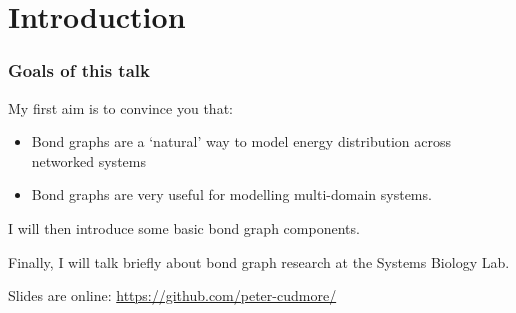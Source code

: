 \section{Introduction}
\begin{frame}
\frametitle{Goals of this talk}
My first aim is to convince you that:
\begin{itemize}
	\item Bond graphs are a `natural' way to model energy distribution across networked systems
	\item Bond graphs are very useful for modelling multi-domain systems.
\end{itemize}

\vspace{10pt}

I will then introduce some basic bond graph components.
\vspace{10pt}

Finally, I will talk briefly about bond graph research at the Systems Biology Lab.
\vspace{10pt}

Slides are online: \url{https://github.com/peter-cudmore/}
\end{frame}

